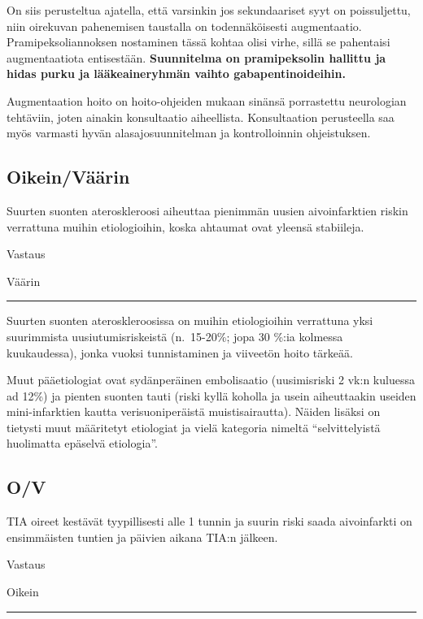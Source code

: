 \documentclass[
]{book}
\begin{document}
On siis perusteltua ajatella, että varsinkin jos sekundaariset syyt on poissuljettu, niin oirekuvan pahenemisen taustalla on todennäköisesti augmentaatio. Pramipeksoliannoksen nostaminen tässä kohtaa olisi virhe, sillä se pahentaisi augmentaatiota entisestään. \textbf{Suunnitelma on pramipeksolin hallittu ja hidas purku ja lääkeaineryhmän vaihto gabapentinoideihin.}

Augmentaation hoito on hoito-ohjeiden mukaan sinänsä porrastettu neurologian tehtäviin, joten ainakin konsultaatio aiheellista. Konsultaation perusteella saa myös varmasti hyvän alasajosuunnitelman ja kontrolloinnin ohjeistuksen.

\subsection{Oikein/Väärin}\label{Oikein-vaarin}

Suurten suonten ateroskleroosi aiheuttaa pienimmän uusien aivoinfarktien riskin verrattuna muihin etiologioihin, koska ahtaumat ovat yleensä stabiileja.

Vastaus

Väärin

\begin{center}\rule{0.5\linewidth}{0.5pt}\end{center}

Suurten suonten ateroskleroosissa on muihin etiologioihin verrattuna yksi suurimmista uusiutumisriskeistä (n.~15-20\%; jopa 30 \%:ia kolmessa kuukaudessa), jonka vuoksi tunnistaminen ja viiveetön hoito tärkeää.

Muut pääetiologiat ovat sydänperäinen embolisaatio (uusimisriski 2 vk:n kuluessa ad 12\%) ja pienten suonten tauti (riski kyllä koholla ja usein aiheuttaakin useiden mini-infarktien kautta verisuoniperäistä muistisairautta). Näiden lisäksi on tietysti muut määritetyt etiologiat ja vielä kategoria nimeltä ``selvittelyistä huolimatta epäselvä etiologia''.

\subsection{O/V}\label{ov}

TIA oireet kestävät tyypillisesti alle 1 tunnin ja suurin riski saada aivoinfarkti on ensimmäisten tuntien ja päivien aikana TIA:n jälkeen.

Vastaus

Oikein

\begin{center}\rule{0.5\linewidth}{0.5pt}\end{center}
\end{document}
